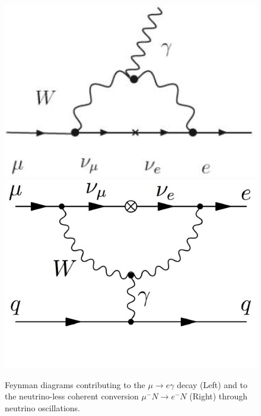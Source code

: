 \documentclass[12pt,a4paper,openright, oneside, titlepage]{book} %
\begin{document}
\begin{figure}[h!]
\includegraphics[scale=0.7]{feynman_mu-egamma}
\includegraphics[scale=0.7]{feynman_mu2e}
\caption{Feynman diagrams contributing to the $\mu\rightarrow e\gamma$ decay (Left) 
and to the neutrino-less coherent conversion $\mu^-N \rightarrow e^-N$ (Right)
through neutrino oscillations.}
\label{_feynman_SM}
\end{figure}
\end{document}
